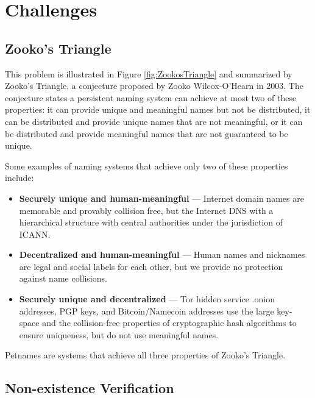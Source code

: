 \documentclass{sig-alternate}
\begin{document}
\section{Challenges}

\subsection{Zooko's Triangle}

This problem is illustrated in Figure \ref{fig:ZookosTriangle} and summarized by Zooko's Triangle, a conjecture proposed by Zooko Wilcox-O'Hearn in 2003. The conjecture states a persistent naming system can achieve at most two of these properties: it can provide unique and meaningful names but not be distributed, it can be distributed and provide unique names that are not meaningful, or it can be distributed and provide meaningful names that are not guaranteed to be unique.\cite{ferdous2009security}\cite{stiegler2005petname}

Some examples of naming systems that achieve only two of these properties include:

\begin{itemize}
	\item \textbf{Securely unique and human-meaningful} --- Internet domain names are memorable and provably collision free, but the Internet DNS with a hierarchical structure with central authorities under the jurisdiction of ICANN.
	\item \textbf{Decentralized and human-meaningful} --- Human names and nicknames are legal and social labels for each other, but we provide no protection against name collisions.
	\item \textbf{Securely unique and decentralized} --- Tor hidden service .onion addresses, PGP keys, and Bitcoin/Namecoin addresses use the large key-space and the collision-free properties of cryptographic hash algorithms to ensure uniqueness, but do not use meaningful names.
\end{itemize}

Petnames are systems that achieve all three properties of Zooko's Triangle.

\subsection{Non-existence Verification}
\end{document}
